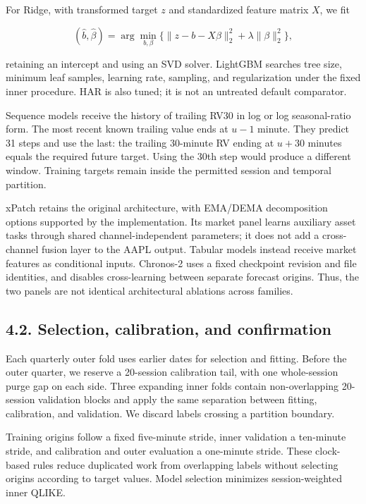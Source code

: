 For Ridge, with transformed target \(z\) and standardized feature matrix
\(X\), we fit

\[
(\widehat b,\widehat\beta)
=\arg\min_{b,\beta}\{\|z-b-X\beta\|_2^2+\lambda\|\beta\|_2^2\},
\]

retaining an intercept and using an SVD solver. LightGBM searches tree
size, minimum leaf samples, learning rate, sampling, and regularization
under the fixed inner procedure. HAR is also tuned; it is not an
untreated default comparator.

Sequence models receive the history of trailing RV30 in log or log
seasonal-ratio form. The most recent known trailing value ends at
\(u-1\) minute. They predict 31 steps and use the last: the trailing
30-minute RV ending at \(u+30\) minutes equals the required future
target. Using the 30th step would produce a different window. Training
targets remain inside the permitted session and temporal partition.

xPatch retains the original architecture, with EMA/DEMA decomposition
options supported by the implementation. Its market panel learns
auxiliary asset tasks through shared channel-independent parameters; it
does not add a cross-channel fusion layer to the AAPL output. Tabular
models instead receive market features as conditional inputs. Chronos-2
uses a fixed checkpoint revision and file identities, and disables
cross-learning between separate forecast origins. Thus, the two panels
are not identical architectural ablations across families.

\subsection{4.2. Selection, calibration, and
confirmation}\label{selection-calibration-and-confirmation}

Each quarterly outer fold uses earlier dates for selection and fitting.
Before the outer quarter, we reserve a 20-session calibration tail, with
one whole-session purge gap on each side. Three expanding inner folds
contain non-overlapping 20-session validation blocks and apply the same
separation between fitting, calibration, and validation. We discard
labels crossing a partition boundary.

Training origins follow a fixed five-minute stride, inner validation a
ten-minute stride, and calibration and outer evaluation a one-minute
stride. These clock-based rules reduce duplicated work from overlapping
labels without selecting origins according to target values. Model
selection minimizes session-weighted inner QLIKE.

